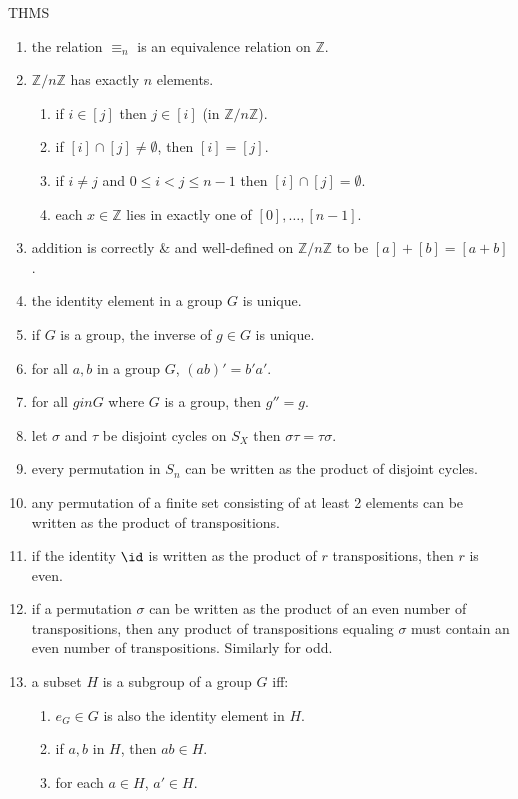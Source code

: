 THMS
\begin{enumerate}
	\item the relation $\equiv_n$ is an equivalence relation on $\mathbb{Z}$. 
	\item $\mathbb{Z}/n\mathbb{Z}$ has exactly $n$ elements. 
	\begin{enumerate}
		\item if $i \in [j]$ then $j \in [i]$ (in $\mathbb{Z}/n\mathbb{Z}$). 
		\item if $[i] \cap [j] \neq \emptyset$, then $[i]=[j]$. 
		\item if $i \neq j$ and $0 \leq i < j \leq n-1$ then $[i] \cap [j] = \emptyset$. 
		\item each $x \in \mathbb{Z}$ lies in exactly one of $[0],\dots,[n-1]$. 
	\end{enumerate}
	\item addition is correctly \& and well-defined on $\mathbb{Z}/n\mathbb{Z}$ to be $[a] + [b] = [a+b]$. 
	\item the identity element in a group $G$ is unique. 
	\item if $G$ is a group, the inverse of $g \in G$ is unique. 
	\item for all $a,b$ in a group $G$, $(ab)' = b'a'$. 
	\item for all $g in G$ where $G$ is a group, then $g'' = g$. 
	\item let $\sigma$ and $\tau$ be disjoint cycles on $S_X$ then $\sigma\tau = \tau\sigma$. 
	\item every permutation in $S_n$ can be written as the product of disjoint cycles. 
	\item any permutation of a finite set consisting of at least 2 elements can be written as the product of transpositions. 
	\item if the identity $\id$ is written as the product of $r$ transpositions, then $r$ is even. 
	\item if a permutation $\sigma$ can be written as the product of an even number of transpositions, then any product of transpositions equaling $\sigma$ must contain an even number of transpositions. Similarly for odd. 
	\item a subset $H$ is a subgroup of a group $G$ iff: 
	\begin{enumerate}
		\item $e_G \in G$ is also the identity element in $H$. 
		\item if $a,b$ in $H$, then $ab \in H$. 
		\item for each $a \in H$, $a' \in H$. 

\end{enumerate}
\end{enumerate}
